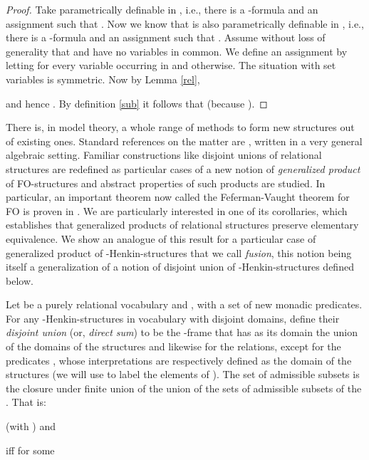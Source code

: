 \documentclass{LMCS}
\newcommand{\fo}{\textsf{FO}\xspace}
\begin{document}
\begin{proof}
Take  parametrically definable in ,
i.e., there is a -formula  and an assignment
 such that . Now we know that
 is also parametrically definable in , i.e., there is a
-formula  and an assignment  such that
. Assume
without loss of generality that  and  have no variables in common. We
define an assignment  by letting  for every
variable  occurring in  and  otherwise. The
situation with set variables is symmetric. Now by Lemma \ref{rel},

and hence . By definition \ref{sub} it follows that  (because ).
\end{proof}
There is, in model theory, a whole range of methods to form new structures out of
existing ones. Standard references on the matter are \cite{1959,2004}, written in a very general algebraic setting.
Familiar constructions like disjoint unions of relational structures are redefined as particular cases of a new notion of
\emph{generalized product} of \fo-structures and abstract properties of such products are studied. In particular, an important
theorem now called the Feferman-Vaught theorem for \fo is proven in  \cite{1959}. We are particularly interested in one of its corollaries, which
establishes that generalized products of relational structures preserve elementary equivalence. We show an
analogue of this result for a particular case of generalized product of -Henkin-structures that we call \emph{fusion}, this notion
being itself a generalization of a notion of disjoint union of -Henkin-structures defined below.
\begin{defi}
  Let  be a purely relational vocabulary and ,
  with  a set of new  monadic predicates.
  For any -Henkin-structures  in vocabulary  with disjoint domains,
  define their \emph{disjoint union}  (or, \emph{direct sum})
  to be the -frame that
  has as its domain the union of the domains of the structures  and likewise for the relations, except for
  the predicates , whose interpretations are
  respectively defined as the domain of the structures  (we will use  to label the elements of ).
  The set of admissible subsets  is the closure under finite union of the union of the sets of
  admissible subsets of the . That is:
  \begin{iteMize}{}
    \item   
    \item    (with ) and 
    \item    iff  for some 
  \end{iteMize}
\label{union}
  \end{defi}
\end{document}
